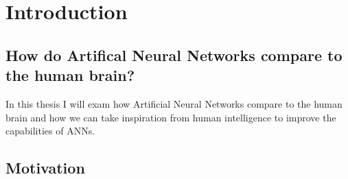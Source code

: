 
\chapter{Introduction} %

\label{Chapter1} %



\section{How do Artifical Neural Networks compare to the human brain?}
In this thesis I will exam how Artificial Neural Networks compare to the human brain and how we can take inspiration from human intelligence to improve the capabilities of ANNs. 

\section{Motivation}








